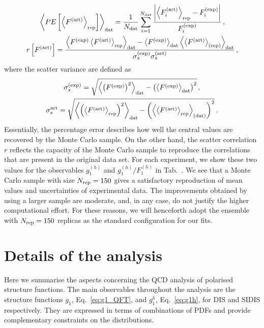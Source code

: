 %
\begin{gather}
  \left< PE \left[ \left< F^{(\textrm{art})} \right>_{\textrm{rep}} \right] \right>_{\textrm{dat}} = \frac{1}{N_{\textrm{dat}}} \sum_{i=1}^{N_{\textrm{dat}}} \frac{\abs{\left< F_i^{\textrm{(art)}} \right>_{\textrm{rep}} - F_{i}^{\textrm{(exp)}}}}{F_i^{\textrm{(exp)}}}\,, \\
  r \left[ F^{\textrm{(art)}} \right] = \frac{\left< F^{\textrm{(exp)}} \left< F^{\textrm{(art)}} \right>_{\textrm{rep}} \right>_{\textrm{dat}} - \left< F^{\textrm{(exp)}} \right>_{\textrm{dat}} \left<  \left< F^{\textrm{(art)}} \right>_{\textrm{(rep)}}\right>_{\textrm{dat}} }{\sigma_s^{\textrm{(exp)}} \sigma_s^{\textrm{(art)}} }\,,
\end{gather}
where the scatter variance are defined as
\begin{gather}
  \sigma^{\textrm{(exp)}}_s = \sqrt{\left< \left( F^{\textrm{(exp)}} \right)^2 \right>_{\textrm{dat}} - \left( \left< F^{\textrm{(exp)}} \right>_{\textrm{dat}} \right)^2} \,,\\
  \sigma^{\textrm{art}}_s = \sqrt{\left< \left( \left<F^{\textrm{(art)}}\right>_{\textrm{rep}} \right)^2 \right>_{\textrm{dat}} - \left( \left< \left<F^{\textrm{(art)}}\right>_{\textrm{rep}} \right>_{\textrm{(dat)}} \right)^2} \,.
\end{gather}
Essentially, the percentage error describes how well the central values are recovered by the Monte Carlo sample. On the other hand, the scatter correlation $r$ reflects the capacity of the Monte Carlo sample to reproduce the correlations that are present in the original data set. For each experiment, we show these two values for the observables $g_1^{(h)}$ and $g_1^{(h)}/F_1^{(h)}$ in Tab.~. We see that a Monte Carlo sample with size $N_{\textrm{rep}} = 150$ gives a satisfactory reproduction of mean values and uncertainties of experimental data. The improvements obtained by using a larger sample are moderate, and, in any case, do not justify the higher computational effort. For these reasons, we will henceforth adopt the ensemble with $N_{\textrm{rep}} = 150$ replicas as the standard configuration for our fits.

\section{Details of the analysis}
\label{sec:4.2}
Here we summarise the aspects concerning the QCD analysis of polarised structure functions. The main observables throughout the analysis are the structure functions $g_1$, Eq.~\eqref{eq:g1_QFT}, and $g_1^h$, Eq.~\eqref{eq:g1h}, for DIS and SIDIS respectively. They are expressed in terms of combinations of PDFs and provide complementary constraints on the distributions.%

